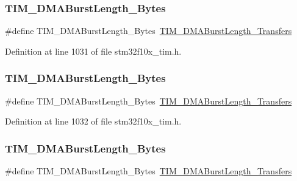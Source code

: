 \subsubsection{\texorpdfstring{T\+I\+M\+\_\+\+D\+M\+A\+Burst\+Length\+\_\+Bytes}{TIM\_DMABurstLength\_6Bytes}}
{\footnotesize\ttfamily \#define T\+I\+M\+\_\+\+D\+M\+A\+Burst\+Length\+\_\+Bytes~\hyperlink{group___t_i_m___d_m_a___burst___length_ga8be40a21654eea72e9c1bf9922675b22}{T\+I\+M\+\_\+\+D\+M\+A\+Burst\+Length\+\_\+Transfers}}



Definition at line 1031 of file stm32f10x\+\_\+tim.\+h.

\mbox{\label{group___t_i_m___legacy_ga5833cc5442c40a97a6a90bcd34a2e773}} 
\subsubsection{\texorpdfstring{T\+I\+M\+\_\+\+D\+M\+A\+Burst\+Length\+\_\+Bytes}{TIM\_DMABurstLength\_7Bytes}}
{\footnotesize\ttfamily \#define T\+I\+M\+\_\+\+D\+M\+A\+Burst\+Length\+\_\+Bytes~\hyperlink{group___t_i_m___d_m_a___burst___length_gaf2ae83bd73b0e92b73e5ebfc11f9bfad}{T\+I\+M\+\_\+\+D\+M\+A\+Burst\+Length\+\_\+Transfers}}



Definition at line 1032 of file stm32f10x\+\_\+tim.\+h.

\mbox{\label{group___t_i_m___legacy_gab7c002a9f06f7c238e15a0c61f047062}} 
\subsubsection{\texorpdfstring{T\+I\+M\+\_\+\+D\+M\+A\+Burst\+Length\+\_\+Bytes}{TIM\_DMABurstLength\_8Bytes}}
{\footnotesize\ttfamily \#define T\+I\+M\+\_\+\+D\+M\+A\+Burst\+Length\+\_\+Bytes~\hyperlink{group___t_i_m___d_m_a___burst___length_ga8a760d7114425596736b0ecdbe5fdea6}{T\+I\+M\+\_\+\+D\+M\+A\+Burst\+Length\+\_\+Transfers}}



